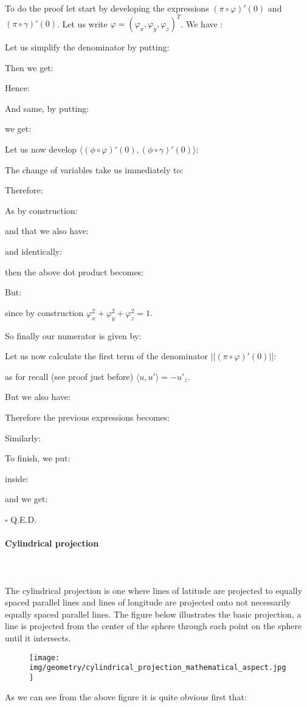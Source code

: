 	\begin{dem}
	To do the proof let start by developing the expressions $(\pi\circ\varphi)'(0)$ and $(\pi\circ\gamma)'(0)$. Let us write $\varphi=(\varphi_x,\varphi_y,\varphi_z)^T$. We have :
	
	Let us simplify the denominator by putting:
	
	Then we get:
	
	Hence:
	
	And same, by putting:
	
	we get:
	
	Let us now develop $\langle (\phi\circ\varphi)'(0),(\phi\circ\gamma)'(0)\rangle$:
	
	The change of variables take us immediately to:
	
	Therefore:
	
	As by construction:
	
	and that we also have:
	
	and identically:
	
	then the above dot product becomes:
	
	But:
	
	since by construction $\varphi_x^2+\varphi_y^2+\varphi_z^2=1$.
	
	So finally our numerator is given by:
	
	Let us now calculate the first term of the denominator $||(\pi\circ\varphi)'(0)||$:
	
	as for recall (see proof just before) $\langle u,u'\rangle=-{u'}_z$.
	
	But we also have:
	
	Therefore the previous expressions becomes:
	
	Similarly:
	
	To finish, we put:
	
	inside:
	
	and we get:
	
	\begin{flushright}
		$\square$  Q.E.D.
	\end{flushright}
	\end{dem}
	
	\pagebreak
	\paragraph{Cylindrical projection}\mbox{}\\\\
	The cylindrical projection is one where lines of latitude are projected to equally spaced parallel lines and lines of longitude are projected onto not necessarily equally spaced parallel lines. The figure below illustrates the basic projection, a line is projected from the center of the sphere through each point on the sphere until it intersects.
	\begin{figure}[H]
		\centering
		\texttt{[image: img/geometry/cylindrical\_projection\_mathematical\_aspect.jpg]}
	\end{figure}
	As we can see from the above figure it is quite obvious first that:
	
